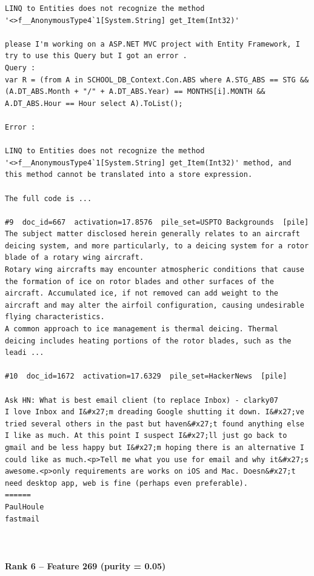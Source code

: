 \begin{verbatim}
LINQ to Entities does not recognize the method '<>f__AnonymousType4`1[System.String] get_Item(Int32)'

please I'm working on a ASP.NET MVC project with Entity Framework, I try to use this Query but I got an error .
Query :
var R = (from A in SCHOOL_DB_Context.Con.ABS where A.STG_ABS == STG && (A.DT_ABS.Month + "/" + A.DT_ABS.Year) == MONTHS[i].MONTH && A.DT_ABS.Hour == Hour select A).ToList();

Error :

LINQ to Entities does not recognize the method
'<>f__AnonymousType4`1[System.String] get_Item(Int32)' method, and
this method cannot be translated into a store expression.

The full code is ...

#9  doc_id=667  activation=17.8576  pile_set=USPTO Backgrounds  [pile]
The subject matter disclosed herein generally relates to an aircraft deicing system, and more particularly, to a deicing system for a rotor blade of a rotary wing aircraft.
Rotary wing aircrafts may encounter atmospheric conditions that cause the formation of ice on rotor blades and other surfaces of the aircraft. Accumulated ice, if not removed can add weight to the aircraft and may alter the airfoil configuration, causing undesirable flying characteristics.
A common approach to ice management is thermal deicing. Thermal deicing includes heating portions of the rotor blades, such as the leadi ...

#10  doc_id=1672  activation=17.6329  pile_set=HackerNews  [pile]

Ask HN: What is best email client (to replace Inbox) - clarky07
I love Inbox and I&#x27;m dreading Google shutting it down. I&#x27;ve tried several others in the past but haven&#x27;t found anything else I like as much. At this point I suspect I&#x27;ll just go back to gmail and be less happy but I&#x27;m hoping there is an alternative I could like as much.<p>Tell me what you use for email and why it&#x27;s awesome.<p>only requirements are works on iOS and Mac. Doesn&#x27;t need desktop app, web is fine (perhaps even preferable).
======
PaulHoule
fastmail



\end{verbatim}

\paragraph*{Rank 6 -- Feature 269 (purity = 0.05)}

